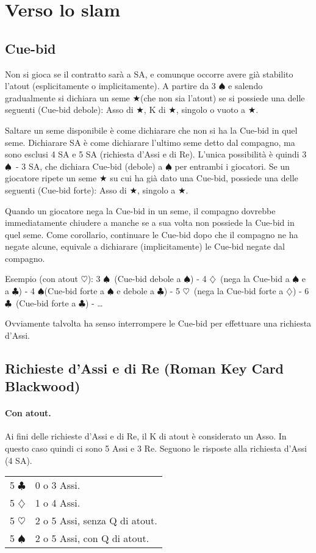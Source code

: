 \documentclass[a4paper,10pt]{article}
\renewcommand{\c}{$\clubsuit$\xspace}
\renewcommand{\d}{$\diamondsuit$\xspace}
\newcommand{\h}{$\heartsuit$\xspace}
\newcommand{\s}{$\spadesuit$\xspace}
\renewcommand{\j}{$\bigstar$\xspace}
\newcommand{\sa}{SA\xspace}
\newcommand{\smallspace}{\vskip0.3cm}
\newenvironment{twocol}
  {\smallspace\noindent\begin{tabular}{l p{0.8\textwidth}}}
  {\end{tabular}\smallspace}
\begin{document}
\pagebreak

\section{Verso lo slam}

\subsection{Cue-bid}

Non si gioca se il contratto sarà a SA, e comunque occorre avere già stabilito l'atout (esplicitamente o implicitamente). A partire da 3 \s e salendo gradualmente si dichiara un seme \j (che non sia l'atout) se si possiede una delle seguenti (Cue-bid debole): Asso di \j, K di \j, singolo o vuoto a \j.

Saltare un seme disponibile è come dichiarare che non si ha la Cue-bid in quel seme. Dichiarare SA è come dichiarare l'ultimo seme detto dal compagno, ma sono esclusi 4 SA e 5 SA (richiesta d'Assi e di Re). L'unica possibilità è quindi 3 \s\ - 3 SA, che dichiara Cue-bid (debole) a \s per entrambi i giocatori. Se un giocatore ripete un seme \j su cui ha già dato una Cue-bid, possiede una delle seguenti (Cue-bid forte): Asso di \j, singolo a \j.

Quando un giocatore nega la Cue-bid in un seme, il compagno dovrebbe immediatamente chiudere a manche se a sua volta non possiede la Cue-bid in quel seme.
Come corollario, continuare le Cue-bid dopo che il compagno ne ha negate alcune, equivale a dichiarare (implicitamente) le Cue-bid negate dal compagno.

Esempio (con atout \h): 3 \s\  (Cue-bid debole a \s) - 4 \d\ (nega la Cue-bid a \s e a \c) - 4 \s (Cue-bid forte a \s e debole a \c) - 5 \h\ (nega la Cue-bid forte a \d) - 6 \c\ (Cue-bid forte a \c) - \dots

Ovviamente talvolta ha senso interrompere le Cue-bid per effettuare una richiesta d'Assi.


\subsection{Richieste d'Assi e di Re (Roman Key Card Blackwood)}

\paragraph{Con atout.} Ai fini delle richieste d'Assi e di Re, il K di atout \`e considerato un Asso. In questo caso quindi ci sono 5 Assi e 3 Re. Seguono le risposte alla richiesta d'Assi (4 \sa).
\begin{twocol}
5 \c & 0 o 3 Assi.\\
5 \d & 1 o 4 Assi.\\
5 \h & 2 o 5 Assi, senza Q di atout.\\
5 \s & 2 o 5 Assi, con Q di atout.\\
\end{twocol}
\end{document}
